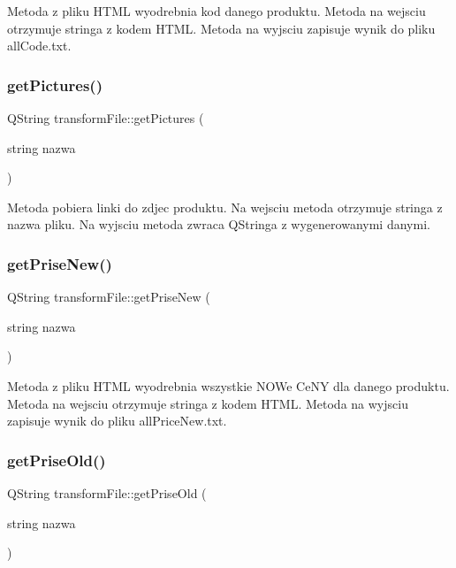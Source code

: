Metoda z pliku H\+T\+ML wyodrebnia kod danego produktu. Metoda na wejsciu otrzymuje stringa z kodem H\+T\+ML. Metoda na wyjsciu zapisuje wynik do pliku all\+Code.\+txt. \mbox{\label{classtransform_file_a1c549e0ca2420d023a507512cc97b8c3}} 
\subsubsection{\texorpdfstring{get\+Pictures()}{getPictures()}}
{\footnotesize\ttfamily Q\+String transform\+File\+::get\+Pictures (\begin{DoxyParamCaption}\item[{string}]{nazwa }\end{DoxyParamCaption})}

Metoda pobiera linki do zdjec produktu. Na wejsciu metoda otrzymuje stringa z nazwa pliku. Na wyjsciu metoda zwraca Q\+Stringa z wygenerowanymi danymi. \mbox{\label{classtransform_file_aa951d2ed03ccc544b804c623fc01c3b2}} 
\subsubsection{\texorpdfstring{get\+Prise\+New()}{getPriseNew()}}
{\footnotesize\ttfamily Q\+String transform\+File\+::get\+Prise\+New (\begin{DoxyParamCaption}\item[{string}]{nazwa }\end{DoxyParamCaption})}

Metoda z pliku H\+T\+ML wyodrebnia wszystkie N\+O\+We Ce\+NY dla danego produktu. Metoda na wejsciu otrzymuje stringa z kodem H\+T\+ML. Metoda na wyjsciu zapisuje wynik do pliku all\+Price\+New.\+txt. \mbox{\label{classtransform_file_af3a59c4dc958a01a50378ea98b13c468}} 
\subsubsection{\texorpdfstring{get\+Prise\+Old()}{getPriseOld()}}
{\footnotesize\ttfamily Q\+String transform\+File\+::get\+Prise\+Old (\begin{DoxyParamCaption}\item[{string}]{nazwa }\end{DoxyParamCaption})}

